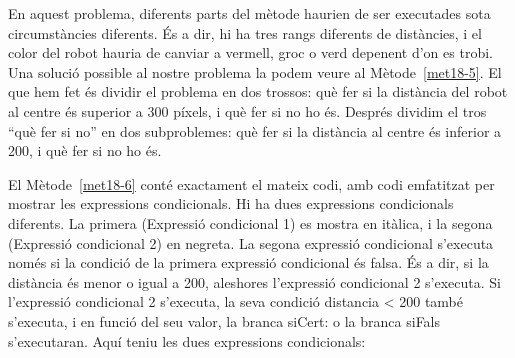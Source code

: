 En aquest problema, diferents parts del mètode haurien de ser executades sota circumstàncies diferents. És a dir, hi ha tres rangs diferents de distàncies, i el color del robot hauria de canviar a vermell, groc o verd depenent d'on es trobi. Una solució possible al nostre problema la podem veure al Mètode~\ref{met18-5}. El que hem fet és dividir el problema en dos trossos: què fer si la distància del robot al centre és superior a 300 píxels, i què fer si no ho és. Després dividim el tros ``què fer si no'' en dos subproblemes: què fer si la distància al centre és inferior a 200, i què fer si no ho és.

El Mètode~\ref{met18-6} conté exactament el mateix codi, amb codi emfatitzat per mostrar les expressions condicionals. Hi ha dues expressions condicionals diferents. La primera (Expressió condicional 1) es mostra en itàlica, i la segona (Expressió condicional 2) en negreta. La segona expressió condicional s'executa només si la condició de la primera expressió condicional és falsa. És a dir, si la distància és menor o igual a 200, aleshores l'expressió condicional 2 s'executa. Si l'expressió condicional 2 s'executa, la seva condició \textsf{distancia \textless \hspace*{1mm}   200} també s'executa, i en funció del seu valor, la branca \textsf{siCert:} o la branca \textsf{siFals} s'executaran. Aquí teniu les dues expressions condicionals:

